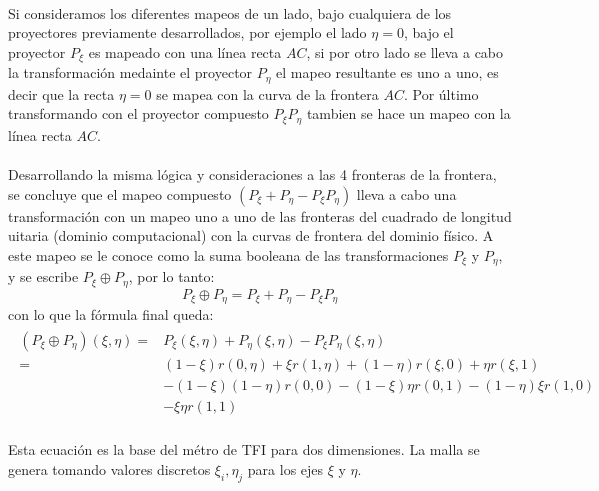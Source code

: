 \documentclass[letterpaper, openright, 12pt]{book}
\begin{document}
    \paragraph*{}
        Si consideramos los diferentes mapeos de un lado, bajo cualquiera de los
        proyectores previamente desarrollados, por ejemplo el lado $\eta = 0$,
        bajo el proyector $P_{\xi}$ es mapeado con una línea recta $AC$, si por
        otro lado se lleva a cabo la transformación medainte el proyector
        $P_{\eta}$ el mapeo resultante es uno a uno, es decir que la recta
        $\eta = 0$ se mapea con la curva de la frontera $AC$. Por último
        transformando con el proyector compuesto $P_{\xi}P_{\eta}$ tambien se
        hace un mapeo con la línea recta $AC$.
    \paragraph*{}
        Desarrollando la misma lógica y consideraciones a las 4 fronteras de la
        frontera, se concluye que el mapeo compuesto $(P_{\xi} + P_{\eta} - P_{\xi}P_{\eta})$
        lleva a cabo una transformación con un mapeo uno  a uno de las fronteras
        del cuadrado de longitud uitaria (dominio computacional) con la curvas
        de frontera del dominio físico. A este mapeo se le conoce como la suma
        booleana de las transformaciones $P_{\xi}$ y $P_{\eta}$, y se escribe
        $P_{\xi}\oplus P_{\eta}$, por lo tanto:
        \begin{equation}
            P_{\xi}\oplus P_{\eta} = P_{\xi} + P_{\eta} - P_{\xi} P_{\eta}
        \end{equation}
        con lo que la fórmula final queda:
        \begin{align}
            \begin{aligned}
                \left( P_{\xi}\oplus P_{\eta} \right)(\xi, \eta) =& P_{\xi}(\xi, \eta) + P_{\eta}(\xi, \eta) - P_{\xi}P_{\eta}(\xi, \eta) \\
                =& (1 - \xi)r(0, \eta) + \xi r(1, \eta) + (1 - \eta)r(\xi, 0) + \eta r(\xi, 1) \\&- (1-\xi)(1 - \eta)r(0, 0) - (1 - \xi)\eta r(0, 1) - (1- \eta)\xi r(1, 0) \\& - \xi \eta r(1,1)
            \end{aligned}
        \end{align}
    \paragraph*{}
            Esta ecuación es la base del métro de TFI para dos dimensiones. La
            malla se genera tomando valores discretos $\xi_{i}, \eta_{j}$ para
            los ejes $\xi$ y $\eta$.
\end{document}
